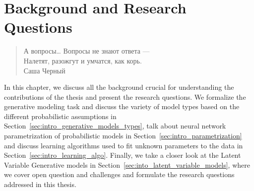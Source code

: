 \chapter{Background and Research Questions}\label{ch:background}
\begin{quote}
\normalsize\itshape
\begin{flushright}
\foreignlanguage{russian}{А вопросы… Вопросы не знают ответа —}\\
\foreignlanguage{russian}{Налетят, разожгут и умчатся, как корь.} \\
\foreignlanguage{russian}{Саша Черный} \\ \vskip 10pt
\end{flushright}
\end{quote}


In this chapter, we discuss all the background crucial for understanding the contributions of the thesis and present the research questions. We formalize the generative modeling task and discuss the variety of model types based on the different probabilistic assumptions in Section~\ref{sec:intro_generative_models_types}, talk about neural network parametrization of probabilistic models in Section~\ref{sec:intro_parametrization} and discuss learning algorithms used to fit unknown parameters to the data in Section~\ref{sec:intro_learning_algo}. Finally, we take a closer look at the Latent Variable Generative models in Section~\ref{sec:into_latent_variable_models}, where we cover open question and challenges and formulate the research questions addressed in this thesis.

